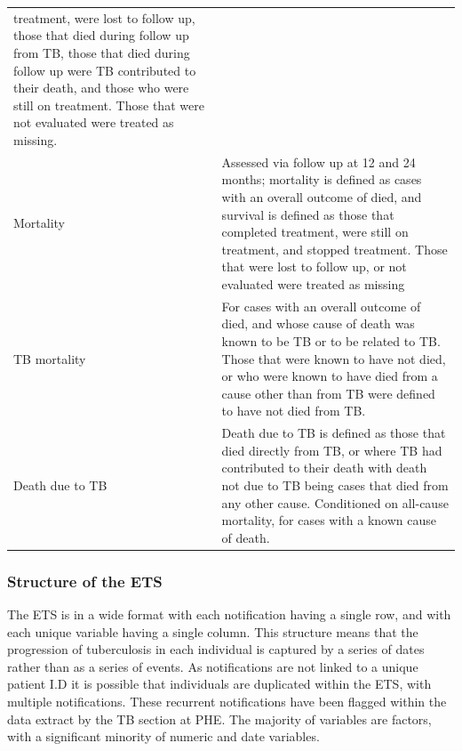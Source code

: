 \documentclass[11pt,twoside]{bristolthesis}
\begin{document}
\begin{longtable}[]{@{}ll@{}}
\begin{minipage}[t]{0.62\columnwidth}
  treatment, were lost to follow up, those that died
  during follow up from TB, those that died during
  follow up were TB contributed to their death, and
  those who were still on treatment. Those that were
  not evaluated were treated as missing.\strut
  \end{minipage}\tabularnewline
  \begin{minipage}[t]{0.33\columnwidth}\raggedright
  Mortality\strut
  \end{minipage} & \begin{minipage}[t]{0.62\columnwidth}\raggedright
  Assessed via follow up at 12 and 24 months;
  mortality is defined as cases with an overall
  outcome of died, and survival is defined as those
  that completed treatment, were still on treatment,
  and stopped treatment. Those that were lost to
  follow up, or not evaluated were treated as
  missing\strut
  \end{minipage}\tabularnewline
  \begin{minipage}[t]{0.33\columnwidth}\raggedright
  TB mortality\strut
  \end{minipage} & \begin{minipage}[t]{0.62\columnwidth}\raggedright
  For cases with an overall outcome of died, and
  whose cause of death was known to be TB or to be
  related to TB. Those that were known to have not
  died, or who were known to have died from a cause
  other than from TB were defined to have not died
  from TB.\strut
  \end{minipage}\tabularnewline
  \begin{minipage}[t]{0.33\columnwidth}\raggedright
  Death due to TB\strut
  \end{minipage} & \begin{minipage}[t]{0.62\columnwidth}\raggedright
  Death due to TB is defined as those that died
  directly from TB, or where TB had contributed to
  their death with death not due to TB being cases
  that died from any other cause. Conditioned on
  all-cause mortality, for cases with a known cause
  of death.\strut
  \end{minipage}\tabularnewline
  \bottomrule
  \end{longtable}
  \hypertarget{structure-of-the-ets}{%
  \subsubsection{Structure of the ETS}\label{structure-of-the-ets}}
  
  The ETS is in a wide format with each notification having a single row, and with each unique variable having a single column. This structure means that the progression of tuberculosis in each individual is captured by a series of dates rather than as a series of events. As notifications are not linked to a unique patient I.D it is possible that individuals are duplicated within the ETS, with multiple notifications. These recurrent notifications have been flagged within the data extract by the TB section at PHE. The majority of variables are factors, with a significant minority of numeric and date variables.
  
\end{document}
